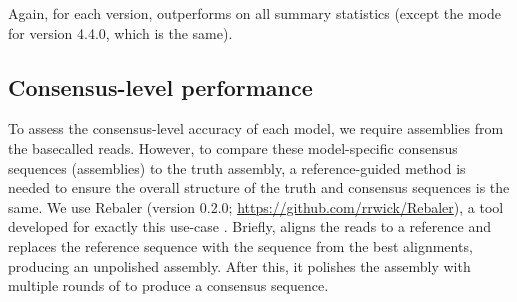 Again, for each version, \tubby{} outperforms \guppy{} on all summary statistics (except the mode for version 4.4.0, which is the same).

\begin{table}
\centering
{}
\caption{Read BLAST identity summary statistics for the \mtb{}-specific basecalling model \tubby{} compared with the default \guppy{} model on the test data - a BCG sample not involved in training \tubby{}. Version indicates the \guppy{} version used for the basecalling before and after training. BLAST identity is the number of matching bases in a read alignment divided by the length of the alignment. Count refers to the number of reads evaluated. Bold text highlights the best-performing model for the relevant metric. std=standard deviation.}
\label{tab:test-read-blast}
\end{table}

\subsection{Consensus-level performance}

To assess the consensus-level accuracy of each model, we require assemblies from the basecalled reads. However, to compare these model-specific consensus sequences (assemblies) to the truth assembly, a reference-guided method is needed to ensure the overall structure of the truth and consensus sequences is the same. We use Rebaler (version 0.2.0; \url{https://github.com/rrwick/Rebaler}), a tool developed for exactly this use-case \cite{wick2019}. Briefly,  aligns the reads to a reference and replaces the reference sequence with the sequence from the best alignments, producing an unpolished assembly. After this, it polishes the assembly with multiple rounds of  to produce a consensus sequence. 

